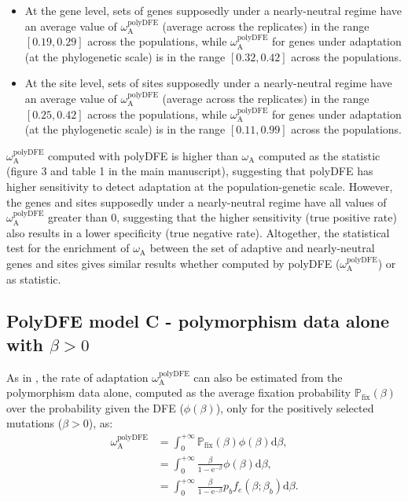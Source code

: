 \documentclass{article}
\newcommand{\der}{\mathrm{d}}
\newcommand{\e}{\mathrm{e}}
\newcommand{\rateApop}{\omega_{\mathrm{A}}}
\newcommand{\proba}{\mathbb{P}}
\newcommand{\pfix}{\proba_{\mathrm{fix}}}
\newcommand{\Spop}{\beta}
\begin{document}
    \begin{itemize}
        \item At the gene level, sets of genes supposedly under a nearly-neutral regime have an average value of $\rateApop^{\mathrm{polyDFE}}$ (average across the replicates) in the range $[0.19,0.29]$ across the populations, while $\rateApop^{\mathrm{polyDFE}}$ for genes under adaptation (at the phylogenetic scale) is in the range $[0.32,0.42]$ across the populations.
        \item At the site level, sets of sites supposedly under a nearly-neutral regime have an average value of $\rateApop^{\mathrm{polyDFE}}$ (average across the replicates) in the range $[0.25,0.42]$ across the populations, while $\rateApop^{\mathrm{polyDFE}}$ for genes under adaptation (at the phylogenetic scale) is in the range $[0.11,0.99]$ across the populations.
    \end{itemize}
    $\rateApop^{\mathrm{polyDFE}}$ computed with polyDFE is higher than $\rateApop$ computed as the \textcite{mcdonald_adaptative_1991} statistic (figure 3 and table 1 in the main manuscript), suggesting that polyDFE has higher sensitivity to detect adaptation at the population-genetic scale.
    However, the genes and sites supposedly under a nearly-neutral regime have all values of $\rateApop^{\mathrm{polyDFE}}$ greater than 0, suggesting that the higher sensitivity (true positive rate) also results in a lower specificity (true negative rate).
    Altogether, the statistical test for the enrichment of $\rateApop$ between the set of adaptive and nearly-neutral genes and sites gives similar results whether computed by polyDFE ($\rateApop^{\mathrm{polyDFE}}$) or as \textcite{mcdonald_adaptative_1991} statistic.

    \pagebreak

    \subsection{PolyDFE model C - polymorphism data alone with $\Spop > 0$}
    As in \textcite{tataru_inference_2017}, the rate of adaptation $\rateApop^{\mathrm{polyDFE}}$ can also be estimated from the polymorphism data alone, computed as the average fixation probability $\pfix (\Spop)$ over the probability given the DFE ($\phi (\Spop)$), only for the positively selected mutations ($\Spop > 0$), as:
    \begin{align}
        \rateApop^{\mathrm{polyDFE}} &= \int_{0}^{+\infty} \pfix (\Spop) \phi (\Spop) \der \Spop, \\
        &= \int_{0}^{+\infty} \frac{\Spop}{1 - \e^{-\Spop}} \phi (\Spop) \der \Spop, \\
        &= \int_{0}^{+\infty} \frac{\Spop}{1 - \e^{-\Spop}} p_b f_{e}(\Spop; \Spop_b) \der \Spop.
    \end{align}
    
\end{document}
